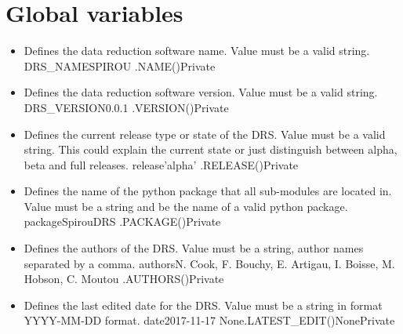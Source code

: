 \fi





\section{Global variables}
\label{ch:variables:global}


\begin{itemize}
\ifdevguide
\item {} 
{Defines the data reduction software name. Value must be a valid string.}
{DRS\_NAME}{SPIROU}
{\AllRecipes}{\spirouConst.NAME()}{\AllRecipes}{Private}
\fi

\ifdevguide
\item {} 
{Defines the data reduction software version. Value must be a valid string.}
{DRS\_VERSION}{0.0.1}
{\AllRecipes}{\spirouConst.VERSION()}{\AllRecipes}{Private}
\fi


\ifdevguide
\item {}
{Defines the current release type or state of the DRS. Value must be a valid string. This could explain the current state or just distinguish between alpha, beta and full releases.}
{release}{'alpha'}
{\AllRecipes}{\spirouConst.RELEASE()}{\AllRecipes}{Private}
\fi

\ifdevguide
\item {}
{Defines the name of the python package that all sub-modules are located in. Value must be a string and be the name of a valid python package.}
{package}{SpirouDRS}
{\AllRecipes}{\spirouConst.PACKAGE()}{\AllRecipes}{Private}
\fi

\ifdevguide
\item {}
{Defines the authors of the DRS. Value must be a string, author names separated by a comma.}
{authors}{N. Cook, F. Bouchy, E. Artigau, I. Boisse, M. Hobson, C. Moutou}
{\AllRecipes}{\spirouConst.AUTHORS()}{\AllRecipes}{Private}
\fi


\ifdevguide
\item {}
{Defines the last edited date for the DRS. Value must be a string in format YYYY-MM-DD format.}
{date}{2017-11-17}
{None}{\spirouConst.LATEST\_EDIT()}{None}{Private}
\fi



\end{itemize}
